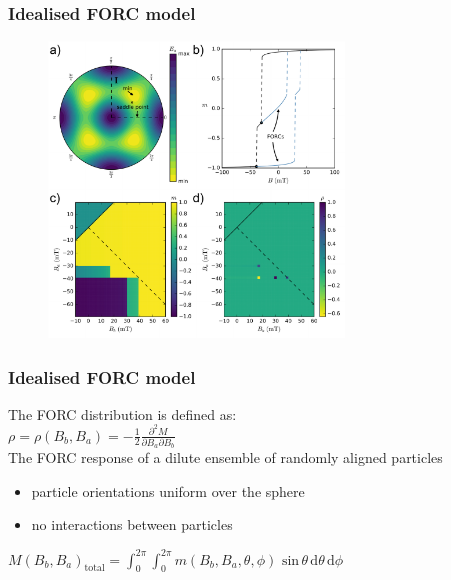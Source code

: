 \documentclass{beamer}
\begin{document}
        \begin{frame}
          \frametitle{Idealised FORC model}
          \begin{figure}[htb]
            \centering
            \includegraphics[width=0.7\textwidth]{Chapter_02_Figure_01.pdf}
          \end{figure}
        \end{frame}

        \begin{frame}
          \frametitle{Idealised FORC model}
          \Large The FORC distribution is defined as:\\
          \vspace{2mm} \center $\rho = \rho(\textit{B}_{\textit{b}}, \textit{B}_{\textit{a}}) = -\frac{\text{1}}{\text{2}}\frac{\partial^{\text{2}} \textit{M}}{\partial \textit{B}_{\textit{a}} \partial \textit{B}_{\textit{b}}}$\\
          \vspace{2mm} \flushleft \large The FORC response of a dilute ensemble of randomly aligned particles
          \begin{itemize}
            \item particle orientations uniform over the sphere
            \item no interactions between particles
          \end{itemize}
          \vspace{2mm} \center $\textit{M}(\textit{B}_{\textit{b}}, \textit{B}_{\textit{a}})_{\text{total}} = {\int^{\text{2}\pi}_{\text{0}}}{\int^{\text{2}\pi}_{\text{0}}} \textit{m}(\textit{B}_{\textit{b}}, \textit{B}_{\textit{a}}, \theta, \phi)\,\,\text{sin}\,\theta\,\text{d}\theta\,\text{d}\phi$
        \end{frame}
\end{document}
